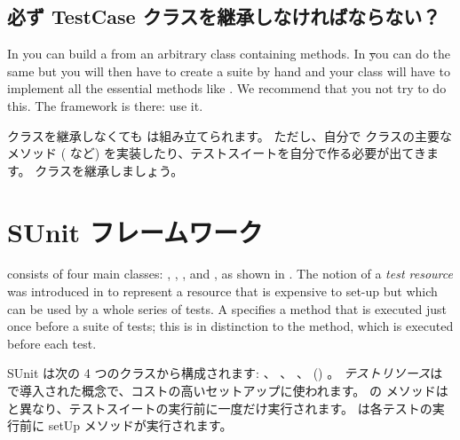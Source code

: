 \documentclass[a4paper,10pt,twoside]{book}
\begin{document}

\subsection{必ず TestCase クラスを継承しなければならない？}

In \JUnit{} you can build a  from an arbitrary class
containing  methods.  In \st you can do the same
but you will then have to create a suite by hand and your class will
have to implement all the essential  methods like .
We recommend that you not try to do this.  The framework is there: use it.
\fi

 クラスを継承しなくても  は組み立てられます。
ただし、自分で  クラスの主要なメソッド ( など) を実装したり、テストスイートを自分で作る必要が出てきます。
 クラスを継承しましょう。


\section{SUnit フレームワーク}

\sunit consists of four main classes: ,
, , and , as shown in .
The notion of a \emph{test resource} was introduced in  to represent a resource that is expensive to set-up but which can be used by
a whole series of tests.  A 
specifies a  method that is executed just once before a suite of tests;
this is in distinction to the  method, which is executed before
each test.
\fi

SUnit は次の 4 つのクラスから構成されます:  、
 、  、  () 。
\emph{テストリソース}は  で導入された概念で、コストの高いセットアップに使われます。
 の  メソッドは  と異なり、テストスイートの実行前に一度だけ実行されます。  は各テストの実行前に setUp メソッドが実行されます。
\end{document}
